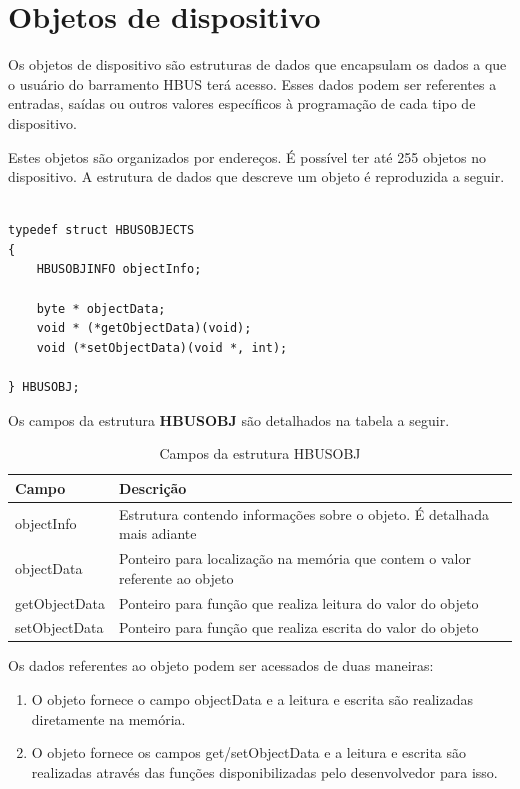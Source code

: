 \documentclass[11pt]{report}
\begin{document}
\section{Objetos de dispositivo}

Os objetos de dispositivo são estruturas de dados que encapsulam os dados a que o usuário do barramento HBUS terá acesso. Esses dados podem ser referentes a entradas, saídas ou outros valores específicos à programação de cada tipo de dispositivo.

Estes objetos são organizados por endereços. É possível ter até 255 objetos no dispositivo. A estrutura de dados que descreve um objeto é reproduzida a seguir.

\begin{verbatim}

typedef struct HBUSOBJECTS
{
	HBUSOBJINFO objectInfo;
	
	byte * objectData;
	void * (*getObjectData)(void);
	void (*setObjectData)(void *, int);
	
} HBUSOBJ;

\end{verbatim}

Os campos da estrutura \textbf{HBUSOBJ} são detalhados na tabela a seguir.

\begin{table}[H]
\centering
\caption{Campos da estrutura HBUSOBJ}
\begin{tabular}{l p{12cm}}

\hline
Campo			&	Descrição\\
\hline
objectInfo		&	Estrutura contendo informações sobre o objeto. É detalhada mais adiante\\
objectData		&	Ponteiro para localização na memória que contem o valor referente ao objeto\\
getObjectData	&	Ponteiro para função que realiza leitura do valor do objeto\\
setObjectData	&	Ponteiro para função que realiza escrita do valor do objeto\\
\hline

\end{tabular}
\end{table}

Os dados referentes ao objeto podem ser acessados de duas maneiras:

\begin{enumerate}

\item O objeto fornece o campo objectData e a leitura e escrita são realizadas diretamente na memória.
\item O objeto fornece os campos get/setObjectData e a leitura e escrita são realizadas através das funções disponibilizadas pelo desenvolvedor para isso.

\end{enumerate}
\end{document}
